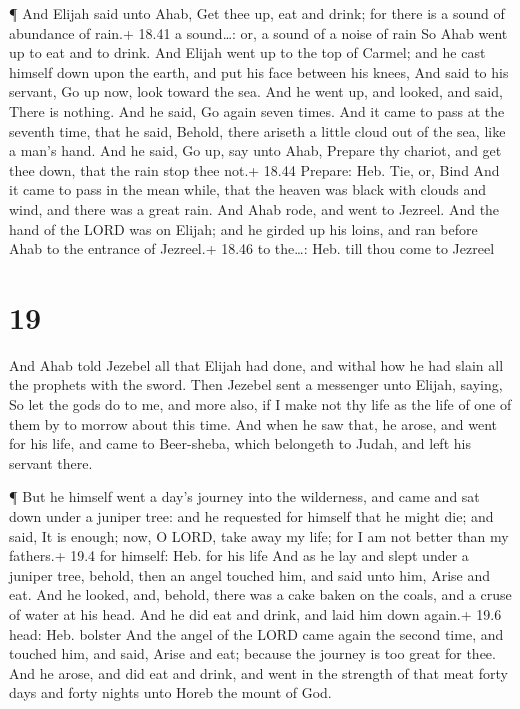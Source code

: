  ¶ And Elijah said unto Ahab, Get thee up, eat and drink;
for there is a sound of abundance of rain.+ 18.41 a sound\ldots: or, a
sound of a noise of rain  So Ahab went up to eat and to
drink. And Elijah went up to the top of Carmel; and he cast himself down
upon the earth, and put his face between his knees,  And
said to his servant, Go up now, look toward the sea. And he went up, and
looked, and said, There is nothing. And he said, Go again seven times.
 And it came to pass at the seventh time, that he said,
Behold, there ariseth a little cloud out of the sea, like a man's hand.
And he said, Go up, say unto Ahab, Prepare thy chariot, and get thee
down, that the rain stop thee not.+ 18.44 Prepare: Heb. Tie, or, Bind
 And it came to pass in the mean while, that the heaven was
black with clouds and wind, and there was a great rain. And Ahab rode,
and went to Jezreel.  And the hand of the LORD was on
Elijah; and he girded up his loins, and ran before Ahab to the entrance
of Jezreel.+ 18.46 to the\ldots: Heb. till thou come to Jezreel

\hypertarget{section-18}{%
\section{19}\label{section-18}}

 And Ahab told Jezebel all that Elijah had done, and withal
how he had slain all the prophets with the sword.  Then
Jezebel sent a messenger unto Elijah, saying, So let the gods do to me,
and more also, if I make not thy life as the life of one of them by to
morrow about this time.  And when he saw that, he arose, and
went for his life, and came to Beer-sheba, which belongeth to Judah, and
left his servant there.

 ¶ But he himself went a day's journey into the wilderness,
and came and sat down under a juniper tree: and he requested for himself
that he might die; and said, It is enough; now, O LORD, take away my
life; for I am not better than my fathers.+ 19.4 for himself: Heb. for
his life  And as he lay and slept under a juniper tree,
behold, then an angel touched him, and said unto him, Arise and eat.
 And he looked, and, behold, there was a cake baken on the
coals, and a cruse of water at his head. And he did eat and drink, and
laid him down again.+ 19.6 head: Heb. bolster  And the angel
of the LORD came again the second time, and touched him, and said, Arise
and eat; because the journey is too great for thee.  And he
arose, and did eat and drink, and went in the strength of that meat
forty days and forty nights unto Horeb the mount of God.

